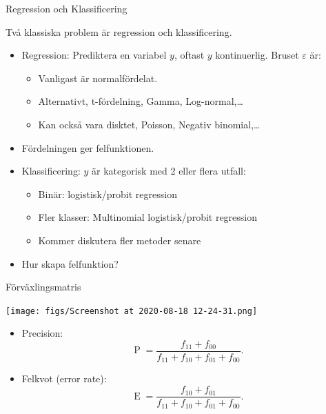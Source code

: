 \documentclass[10pt,english]{beamer}
\begin{document}
\begin{frame}{Regression och Klassificering}
    
    Två klassiska problem är regression och klassificering.

    \begin{itemize}
        \item Regression: Prediktera en variabel $y$, oftast $y$ kontinuerlig. Bruset $\varepsilon$ är:
        \begin{itemize}
            \item Vanligast är normalfördelat.
            \item Alternativt, t-fördelning, Gamma, Log-normal,\dots
            \item Kan också vara disktet, Poisson, Negativ binomial,\dots
        \end{itemize}
        \item Fördelningen ger felfunktionen.
        \item Klassificering: $y$ är kategorisk med 2 eller flera utfall:
        \begin{itemize}
            \item Binär: logistisk/probit regression
            \item Fler klasser: Multinomial logistisk/probit regression
            \item Kommer diskutera fler metoder senare
        \end{itemize}
        \item Hur skapa felfunktion?
    \end{itemize}

\end{frame}

\begin{frame}{Förväxlingsmatris}
\begin{center}
    \texttt{[image: figs/Screenshot at 2020-08-18 12-24-31.png]}
\end{center}

\begin{itemize}
    \item Precision:
    \begin{equation*}
        \operatorname{P} = \frac{f_{11} + f_{00}}{f_{11} + f_{10} + f_{01} + f_{00}}.
    \end{equation*}
    \item Felkvot (error rate):
    \begin{equation*}
        \operatorname{E} = \frac{f_{10} + f_{01}}{f_{11} + f_{10} + f_{01} + f_{00}}.
    \end{equation*}
\end{itemize}
    
\end{frame}
\end{document}
